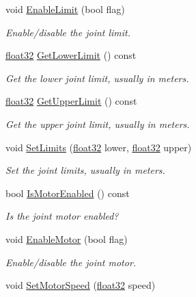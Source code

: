 \begin{DoxyCompactItemize}
void \mbox{\hyperlink{classb2_prismatic_joint_a6d419afe7bd4b0e36d2e4607df7f79f2}{Enable\+Limit}} (bool flag)
\begin{DoxyCompactList}\small\item\em Enable/disable the joint limit. \end{DoxyCompactList}\item 
\mbox{\hyperlink{b2_settings_8h_aacdc525d6f7bddb3ae95d5c311bd06a1}{float32}} \mbox{\hyperlink{classb2_prismatic_joint_a10a2d3c03164190d279fa3c72eafb49e}{Get\+Lower\+Limit}} () const
\begin{DoxyCompactList}\small\item\em Get the lower joint limit, usually in meters. \end{DoxyCompactList}\item 
\mbox{\hyperlink{b2_settings_8h_aacdc525d6f7bddb3ae95d5c311bd06a1}{float32}} \mbox{\hyperlink{classb2_prismatic_joint_aabae1da55e500b9c77007de4d085ffda}{Get\+Upper\+Limit}} () const
\begin{DoxyCompactList}\small\item\em Get the upper joint limit, usually in meters. \end{DoxyCompactList}\item 
void \mbox{\hyperlink{classb2_prismatic_joint_a82a220e6d5a212c1924882e0855b0bef}{Set\+Limits}} (\mbox{\hyperlink{b2_settings_8h_aacdc525d6f7bddb3ae95d5c311bd06a1}{float32}} lower, \mbox{\hyperlink{b2_settings_8h_aacdc525d6f7bddb3ae95d5c311bd06a1}{float32}} upper)
\begin{DoxyCompactList}\small\item\em Set the joint limits, usually in meters. \end{DoxyCompactList}\item 
bool \mbox{\hyperlink{classb2_prismatic_joint_a06492dabf33439efdebceb29899c7fc9}{Is\+Motor\+Enabled}} () const
\begin{DoxyCompactList}\small\item\em Is the joint motor enabled? \end{DoxyCompactList}\item 
void \mbox{\hyperlink{classb2_prismatic_joint_a4a7fd079de49f7ed5aa4a5d8d90be2a2}{Enable\+Motor}} (bool flag)
\begin{DoxyCompactList}\small\item\em Enable/disable the joint motor. \end{DoxyCompactList}\item 
void \mbox{\hyperlink{classb2_prismatic_joint_a602ef7a6ca4fca55d011f1b38ab5a6c3}{Set\+Motor\+Speed}} (\mbox{\hyperlink{b2_settings_8h_aacdc525d6f7bddb3ae95d5c311bd06a1}{float32}} speed)

\end{DoxyCompactItemize}
